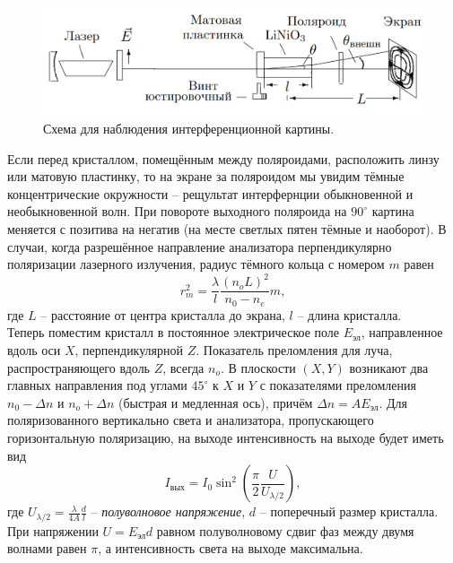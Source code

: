 \documentclass[a4paper,12pt]{article}
\begin{document}
\begin{figure}[h!]
	\begin{center}
		\includegraphics[scale = 0.5]{1.png}
	\end{center}
	\caption{Схема для наблюдения интерференционной картины.}
\end{figure}
Если перед кристаллом, помещённым между поляроидами, расположить линзу или матовую пластинку, то на экране за поляроидом мы увидим тёмные концентрические окружности -- рещультат интерфернции обыкновенной и необыкновенной волн. При повороте выходного поляроида на $90^\circ$ картина меняется с позитива на негатив (на месте светлых пятен тёмные и наоборот). В случаи, когда разрешённое направление анализатора перпендикулярно поляризации лазерного излучения, радиус тёмного кольца с номером $m$ равен
\begin{equation}
r_m^2 = \dfrac{\lambda}{l} \dfrac{(n_oL)^2}{n_0 - n_e}m,
\end{equation}
где $L$ -- расстояние от центра кристалла до экрана, $l$ -- длина кристалла.\\
Теперь поместим кристалл в постоянное электрическое поле $E_{\text{эл}}$, направленное вдоль оси $X$, перпендикулярной $Z$. Показатель преломления для луча, распространяющего вдоль $Z$, всегда $n_o$. В плоскости $(X,Y)$ возникают два главных направления под углами $45^\circ$ к $X$ и $Y$ с показателями преломления $n_0 - \Delta n$ и $n_o + \Delta n$ (быстрая и медленная ось), причём $\Delta n = A E_{\text{эл}}$. Для поляризованного вертикально света и анализатора, пропускающего горизонтальную поляризацию, на выходе интенсивность на выходе будет иметь вид
\begin{equation}
I_{\text{вых}} = I_0 \sin^2 \left(\dfrac{\pi}{2} \dfrac{U}{U_{\lambda/2}} \right),
\end{equation}
где $U_{\lambda/2} = \frac{\lambda}{4A}\frac{d}{l}$ -- \textit{полуволновое напряжение}, $d$ -- поперечный размер кристалла.  При напряжении $U = E_{\text{эл}}d$ равном полуволновому сдвиг фаз между двумя волнами равен $\pi$, а интенсивность света на выходе максимальна. 
\end{document}
